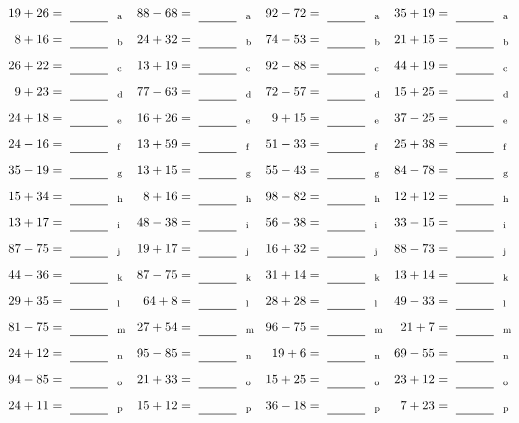 \documentclass
[
  draft    = true,
  fontsize = 11pt,
  parskip  = half-
]
{scrartcl}
\begin{document}
\clearpage
\begin{align*}
    \pline{19+26}&=\rline{a}
  & \pline{88-68}&=\rline{a}
  & \pline{92-72}&=\rline{a}
  & \pline{35+19}&=\rline{a} \\[1ex]
    \pline{8+16}&=\rline{b}
  & \pline{24+32}&=\rline{b}
  & \pline{74-53}&=\rline{b}
  & \pline{21+15}&=\rline{b} \\[1ex]
    \pline{26+22}&=\rline{c}
  & \pline{13+19}&=\rline{c}
  & \pline{92-88}&=\rline{c}
  & \pline{44+19}&=\rline{c} \\[1ex]
    \pline{9+23}&=\rline{d}
  & \pline{77-63}&=\rline{d}
  & \pline{72-57}&=\rline{d}
  & \pline{15+25}&=\rline{d} \\[1ex]
    \pline{24+18}&=\rline{e}
  & \pline{16+26}&=\rline{e}
  & \pline{9+15}&=\rline{e}
  & \pline{37-25}&=\rline{e} \\[1ex]
    \pline{24-16}&=\rline{f}
  & \pline{13+59}&=\rline{f}
  & \pline{51-33}&=\rline{f}
  & \pline{25+38}&=\rline{f} \\[1ex]
    \pline{35-19}&=\rline{g}
  & \pline{13+15}&=\rline{g}
  & \pline{55-43}&=\rline{g}
  & \pline{84-78}&=\rline{g} \\[1ex]
    \pline{15+34}&=\rline{h}
  & \pline{8+16}&=\rline{h}
  & \pline{98-82}&=\rline{h}
  & \pline{12+12}&=\rline{h} \\[1ex]
    \pline{13+17}&=\rline{i}
  & \pline{48-38}&=\rline{i}
  & \pline{56-38}&=\rline{i}
  & \pline{33-15}&=\rline{i} \\[1ex]
    \pline{87-75}&=\rline{j}
  & \pline{19+17}&=\rline{j}
  & \pline{16+32}&=\rline{j}
  & \pline{88-73}&=\rline{j} \\[1ex]
    \pline{44-36}&=\rline{k}
  & \pline{87-75}&=\rline{k}
  & \pline{31+14}&=\rline{k}
  & \pline{13+14}&=\rline{k} \\[1ex]
    \pline{29+35}&=\rline{l}
  & \pline{64+8}&=\rline{l}
  & \pline{28+28}&=\rline{l}
  & \pline{49-33}&=\rline{l} \\[1ex]
    \pline{81-75}&=\rline{m}
  & \pline{27+54}&=\rline{m}
  & \pline{96-75}&=\rline{m}
  & \pline{21+7}&=\rline{m} \\[1ex]
    \pline{24+12}&=\rline{n}
  & \pline{95-85}&=\rline{n}
  & \pline{19+6}&=\rline{n}
  & \pline{69-55}&=\rline{n} \\[1ex]
    \pline{94-85}&=\rline{o}
  & \pline{21+33}&=\rline{o}
  & \pline{15+25}&=\rline{o}
  & \pline{23+12}&=\rline{o} \\[1ex]
    \pline{24+11}&=\rline{p}
  & \pline{15+12}&=\rline{p}
  & \pline{36-18}&=\rline{p}
  & \pline{7+23}&=\rline{p}
\end{align*}
\end{document}
